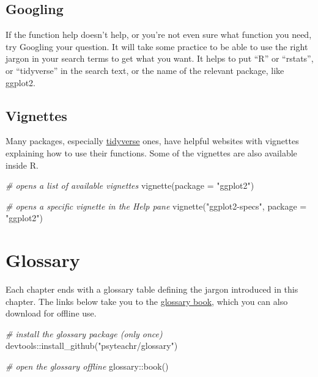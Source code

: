 \documentclass[
  oneside]{book}
\newenvironment{Shaded}{\begin{snugshade}}{\end{snugshade}}
\newcommand{\AttributeTok}[1]{\textcolor[rgb]{0.77,0.63,0.00}{#1}}
\newcommand{\CommentTok}[1]{\textcolor[rgb]{0.56,0.35,0.01}{\textit{#1}}}
\newcommand{\FunctionTok}[1]{\textcolor[rgb]{0.00,0.00,0.00}{#1}}
\newcommand{\NormalTok}[1]{#1}
\newcommand{\SpecialCharTok}[1]{\textcolor[rgb]{0.00,0.00,0.00}{#1}}
\newcommand{\StringTok}[1]{\textcolor[rgb]{0.31,0.60,0.02}{#1}}
\begin{document}
\hypertarget{googling}{%
\subsection{Googling}\label{googling}}

If the function help doesn't help, or you're not even sure what function you need, try Googling your question. It will take some practice to be able to use the right jargon in your search terms to get what you want. It helps to put ``R'' or ``rstats'', or ``tidyverse'' in the search text, or the name of the relevant package, like ggplot2.

\hypertarget{vignettes}{%
\subsection{Vignettes}\label{vignettes}}

Many packages, especially \href{https://www.tidyverse.org/packages/}{tidyverse} ones, have helpful websites with vignettes explaining how to use their functions. Some of the vignettes are also available inside R.

\begin{Shaded}
\begin{Highlighting}[]
\CommentTok{\# opens a list of available vignettes}
\FunctionTok{vignette}\NormalTok{(}\AttributeTok{package =} \StringTok{"ggplot2"}\NormalTok{)}

\CommentTok{\# opens a specific vignette in the Help pane}
\FunctionTok{vignette}\NormalTok{(}\StringTok{"ggplot2{-}specs"}\NormalTok{, }\AttributeTok{package =} \StringTok{"ggplot2"}\NormalTok{)}
\end{Highlighting}
\end{Shaded}

\hypertarget{glossaryintro}{%
\section{Glossary}\label{glossaryintro}}

Each chapter ends with a glossary table defining the jargon introduced in this chapter. The links below take you to the \href{https://psyteachr.github.io/glossary}{glossary book}, which you can also download for offline use.

\begin{Shaded}
\begin{Highlighting}[]
\CommentTok{\# install the glossary package (only once)}
\NormalTok{devtools}\SpecialCharTok{::}\FunctionTok{install\_github}\NormalTok{(}\StringTok{"psyteachr/glossary"}\NormalTok{)}

\CommentTok{\# open the glossary offline }
\NormalTok{glossary}\SpecialCharTok{::}\FunctionTok{book}\NormalTok{()}
\end{Highlighting}
\end{Shaded}
\end{document}
